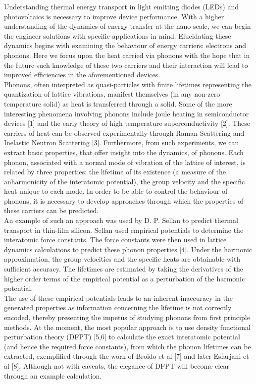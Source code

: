 \documentclass{article}
\numberwithin{equation}{section}
\begin{document}
Understanding thermal energy transport in light emitting diodes (LEDs) and photovoltaics is necessary to improve device performance. With a higher understanding of the dynamics of energy transfer at the nano-scale, we can begin the engineer solutions with specific applications in mind. Elucidating these dynamics begins with examining the behaviour of energy carriers: electrons and phonons. Here we focus upon the heat carried via phonons with the hope that in the future such knowledge of these two carriers and their interaction will lead to improved efficiencies in the aforementioned devices.\\
Phonons, often interpreted as quasi-particles with finite lifetimes representing the quantization of lattice vibrations, manifest themselves (in any non-zero temperature solid) as heat is transferred through a solid. Some of the more interesting phenomena involving phonons include joule heating in semiconductor devices [1] and the early theory of high temperature superconductivity [2]. These carriers of heat can be observed experimentally through Raman Scattering and Inelastic Neutron Scattering [3]. Furthermore, from such experiments, we can extract basic properties, that offer insight into the dynamics, of phonons. Each phonon, associated with a normal mode of vibration of the lattice of interest, is related by three properties: the lifetime of its existence (a measure of the anharmonicity of the interatomic potential), the group velocity and the specific heat unique to each mode. In order to be able to control the behaviour of phonons, it is necessary to develop approaches through which the properties of these carriers can be predicted.\\
An example of such an approach was used by D. P. Sellan to predict thermal transport in thin-film silicon. Sellan used empirical potentials to determine the interatomic force constants. The force constants were then used in lattice dynamics calculations to predict these phonon properties [4]. Under the harmonic approximation, the group velocities and the specific heats are obtainable with sufficient accuracy. The lifetimes are estimated by taking the derivatives of the higher order terms of the empirical potential as a perturbation of the harmonic potential.\\
The use of these empirical potentials leads to an inherent inaccuracy in the generated properties as information concerning the lifetime is not correctly encoded, thereby presenting the impetus of studying phonons from first principle methods. At the moment, the most popular approach is to use density functional perturbation theory (DFPT) [5,6] to calculate the exact interatomic potential (and hence the required force constants), from which the phonon lifetimes can be extracted, exemplified through the work of Broido et al [7] and later Esfarjani et al [8]. Although not with caveats, the elegance of DFPT will become clear through an example calculation.\\
\end{document}
